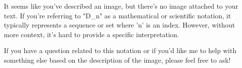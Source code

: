 It seems like you've described an image, but there's no image attached to your text. If you're referring to "D_n" as a mathematical or scientific notation, it typically represents a sequence or set where 'n' is an index. However, without more context, it's hard to provide a specific interpretation.

If you have a question related to this notation or if you'd like me to help with something else based on the description of the image, please feel free to ask!